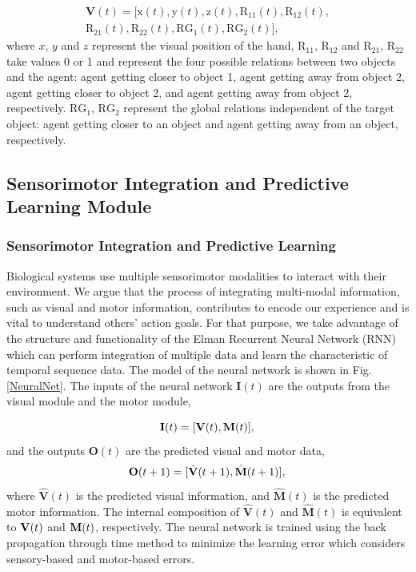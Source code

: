 \documentclass[conference]{IEEEtran}
\begin{document}
\begin{equation}
\begin{split}
	\textbf{V}(t)=[\text{x}(t), \text{y}(t), \text{z}(t), \text{R}_{11}(t), \text{R}_{12}(t),\\ \text{R}_{21}(t), \text{R}_{22}(t), \text{RG}_{1}(t), \text{RG}_{2}(t)],
\end{split}
\end{equation}
where $x$, $y$ and $z$ represent the visual position of the hand, \(\text{R}_{11}\), \(\text{R}_{12}\) and \(\text{R}_{21}\), \(\text{R}_{22}\) take values 0 or 1 and represent the four possible relations between two objects and the agent: agent getting closer to object 1, agent getting away from object 2, agent getting closer to object 2, and agent getting away from object 2, respectively. \(\text{RG}_{1}\), \(\text{RG}_{2}\) represent the global relations independent of the target object: agent getting closer to an object and agent getting away from an object, respectively.

\subsection{Sensorimotor Integration and Predictive Learning Module}
\subsubsection{Sensorimotor Integration and Predictive Learning}
Biological systems use multiple sensorimotor modalities to interact with their environment. We argue that the process of integrating multi-modal information, such as visual and motor information, contributes to encode our experience and is vital to understand others' action goals. For that purpose, we take advantage of the structure and functionality of the Elman Recurrent Neural Network (RNN) \cite{elman1990finding} which can perform integration of multiple data and learn the characteristic of temporal sequence data. The model of the neural network is shown in Fig. \ref{NeuralNet}. The inputs of the neural network \(\textbf{I}(t)\) are the outputs from the visual module and the motor module,

\begin{equation}
	\textbf{I}(t)=[\textbf{V}(t), \textbf{M}(t)],\\
\end{equation}
and the outputs \(\textbf{O}(t)\) are the predicted visual and motor data,
\begin{equation}
	\textbf{O}(t+1)=[\hat{\textbf{V}}(t+1), \hat{\textbf{M}}(t+1)],\\
\end{equation}
where \(\hat{\textbf{V}}(t)\) is the predicted visual information, and  \(\hat{\textbf{M}}(t)\) is the predicted motor information. The internal composition of \(\hat{\textbf{V}}(t)\) and \(\hat{\textbf{M}}(t)\) is equivalent to \(\text{\textbf{V}}(t)\) and \(\text{\textbf{M}}(t)\), respectively. The neural network is trained using the back propagation through time method to minimize the learning error which considers sensory-based and motor-based errors.
\end{document}
